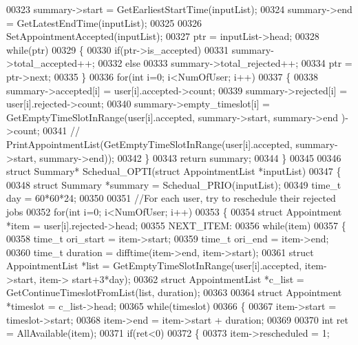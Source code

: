 \begin{DoxyCode}
00323     summary->start = GetEarliestStartTime(inputList);
00324     summary->end = GetLatestEndTime(inputList);
00325     
00326     SetAppointmentAccepted(inputList);
00327     ptr = inputList->head;
00328     \textcolor{keywordflow}{while}(ptr)
00329     \{
00330         \textcolor{keywordflow}{if}(ptr->is\_accepted)
00331             summary->total\_accepted++;
00332         \textcolor{keywordflow}{else}
00333             summary->total\_rejected++;
00334         ptr = ptr->next;
00335     \}
00336     \textcolor{keywordflow}{for}(\textcolor{keywordtype}{int} i=0; i<NumOfUser; i++)
00337     \{
00338         summary->accepted[i] = user[i].accepted->count;
00339         summary->rejected[i] = user[i].rejected->count;
00340         summary->empty\_timeslot[i] = GetEmptyTimeSlotInRange(user[i].accepted, summary->start, summary->end
      )->count;
00341         \textcolor{comment}{// PrintAppointmentList(GetEmptyTimeSlotInRange(user[i].accepted, summary->start, summary->end));}
00342     \}
00343     \textcolor{keywordflow}{return} summary;
00344 \}
00345 
00346 \textcolor{keyword}{struct }Summary* Schedual_OPTI(\textcolor{keyword}{struct} AppointmentList *inputList)
00347 \{
00348     \textcolor{keyword}{struct }Summary *summary = Schedual_PRIO(inputList);
00349     time\_t day = 60*60*24;
00350 
00351     \textcolor{comment}{//For each user, try to reschedule their rejected jobs}
00352     \textcolor{keywordflow}{for}(\textcolor{keywordtype}{int} i=0; i<NumOfUser; i++)
00353     \{
00354         \textcolor{keyword}{struct }Appointment *item = user[i].rejected->head;
00355         NEXT\_ITEM:
00356         \textcolor{keywordflow}{while}(item)
00357         \{
00358             time\_t ori\_start = item->start;
00359             time\_t ori\_end = item->end;
00360             time\_t duration = difftime(item->end, item->start);
00361             \textcolor{keyword}{struct }AppointmentList *list = GetEmptyTimeSlotInRange(user[i].accepted, item->start, item->
      start+3*day);
00362             \textcolor{keyword}{struct }AppointmentList *c\_list = GetContinueTimeslotFromList(list, duration);
00363 
00364             \textcolor{keyword}{struct }Appointment *timeslot = c\_list->head;
00365             \textcolor{keywordflow}{while}(timeslot)
00366             \{
00367                 item->start = timeslot->start;
00368                 item->end = item->start + duration;
00369 
00370                 \textcolor{keywordtype}{int} ret = AllAvailable(item);
00371                 \textcolor{keywordflow}{if}(ret<0)
00372                 \{
00373                     item->rescheduled = 1;

\end{DoxyCode}
